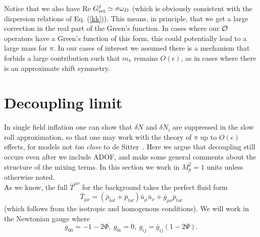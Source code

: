 \documentclass[11pt,amsmath,floats,floatfix,nofootinbib,secnumarabic, superscriptaddress, tightenlines]{revtex4}
\newcommand{\beq}{\begin{equation}}
\newcommand{\eeq}{\end{equation}}
\newcommand{\calo}{{\cal O}}
\begin{document}
{Notice that we also have Re $G^j_{\rm ret} \simeq \sigma\omega_D$ (which is obviously consistent with the dispersion relations of Eq. (\ref{kk})). This means, in principle, that we get a large correction in the real part of the Green's function. In cases where our ${\calo}$ operators have a Green's function of this form, this could potentially lead to a large mass for $\pi$. In our cases of interest we assumed there is a mechanism that forbids a large contribution such that $m_\pi$ remains $O(\epsilon)$, as in cases where there is an approximate shift symmetry.

\section{Decoupling limit}\label{appdec}

In single field inflation one can show that $\delta N$ and $\delta N_i$ are suppressed in the slow roll approximation, so that
 one may work with the theory of $\pi$ up to $O(\epsilon)$ effects, for models not {\it too close} to de Sitter~\cite{eft1}. Here we argue  that decoupling still occurs even
after we include ADOF, and make some general comments about the structure of the mixing terms. In this section we work in $M^2_p=1$ units
unless otherwise noted.\\

As we know, the full ${\bar T}^{\mu\nu}$ for the background takes the perfect fluid form
\beq
{\bar T}_{\mu\nu} = (\bar \rho_{tot}+\bar p_{tot}){\bar u}_\mu {\bar u}_\nu + \bar g_{\mu\nu} \bar p_{tot}
\eeq
(which follows from the isotropic and homogenous conditions). We will work in the Newtonian gauge where
\beq
g_{00} = -1-2\Phi,~ g_{0i}=0,~ g_{ij} = \bar g_{ij} (1-2\Psi).
\eeq

}
\end{document}
